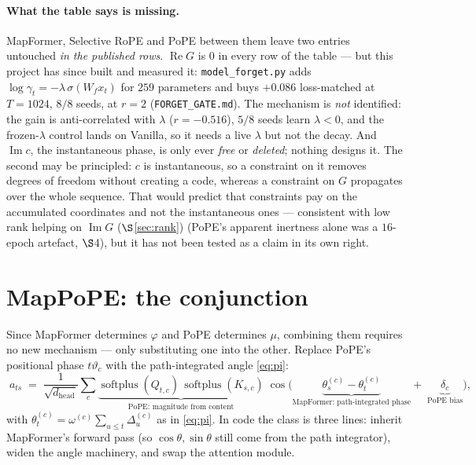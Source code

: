 \documentclass[11pt]{article}
\newcommand{\hd}{d_{\mathrm{head}}}
\DeclareMathOperator{\softplus}{softplus}
\begin{document}
\paragraph{What the table says is missing.} MapFormer, Selective RoPE and PoPE
between them leave two entries untouched \emph{in the published rows}.
$\operatorname{Re}G$ is $0$ in every row of the table --- but this project has since
built and measured it: \texttt{model\_forget.py} adds
$\log\gamma_t = -\lambda\,\sigma(W_fx_t)$ for $259$ parameters and buys $+0.086$
loss-matched at $T=1024$, $8/8$ seeds, at $r=2$ (\texttt{FORGET\_GATE.md}). The
mechanism is \emph{not} identified: the gain is anti-correlated with $\lambda$
($r=-0.516$), $5/8$ seeds learn $\lambda<0$, and the frozen-$\lambda$ control lands
on Vanilla, so it needs a live $\lambda$ but not the decay. And
$\operatorname{Im}c$, the instantaneous phase, is only ever \emph{free} or
\emph{deleted}; nothing designs it. The second may be principled: $c$ is
instantaneous, so a constraint on it removes degrees of freedom without creating a
code, whereas a constraint on $G$ propagates over the whole sequence. That would
predict that constraints pay on the accumulated coordinates and not the
instantaneous ones --- consistent with low rank helping on $\operatorname{Im}G$
($\S$\ref{sec:rank}) (PoPE's apparent inertness alone was a $16$-epoch artefact,
$\S$4), but it has not been tested as a claim in its own right.

\section{MapPoPE: the conjunction}

Since MapFormer determines $\varphi$ and PoPE determines $\mu$, combining them
requires no new mechanism --- only substituting one into the other. Replace
PoPE's positional phase $t\vartheta_c$ with the path-integrated angle
\eqref{eq:pi}:
\begin{equation}
  \label{eq:mappope}
  \boxed{\;
  a_{ts} \;=\; \frac{1}{\sqrt{\hd}}\sum_{c}
    \underbrace{\softplus(Q_{t,c})\,\softplus(K_{s,c})}_{\text{PoPE: magnitude from content}}
    \;\cos\Big(
      \underbrace{\theta_s^{(c)} - \theta_t^{(c)}}_{\text{MapFormer: path-integrated phase}}
      + \;\underbrace{\delta_c}_{\text{PoPE bias}}\Big),}
\end{equation}
with $\theta^{(c)}_t = \omega^{(c)}\sum_{u\le t}\Delta^{(c)}_u$ as in
\eqref{eq:pi}. In code the class is three lines: inherit MapFormer's forward pass
(so $\cos\theta,\sin\theta$ still come from the path integrator), widen the angle
machinery, and swap the attention module.
\end{document}
